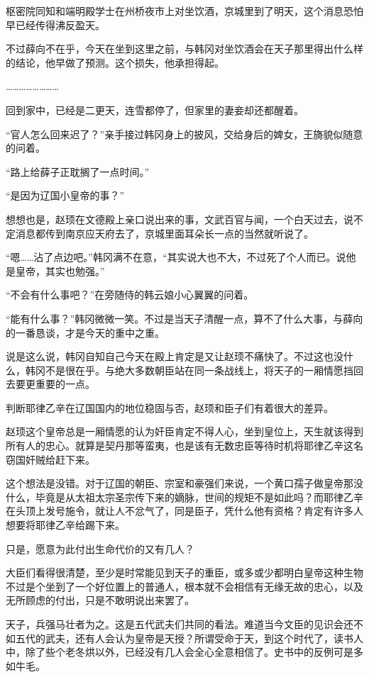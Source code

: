 枢密院同知和端明殿学士在州桥夜市上对坐饮酒，京城里到了明天，这个消息恐怕早已经传得沸反盈天。

不过薛向不在乎，今天在坐到这里之前，与韩冈对坐饮酒会在天子那里得出什么样的结论，他早做了预测。这个损失，他承担得起。

……………………

回到家中，已经是二更天，连雪都停了，但家里的妻妾却还都醒着。

“官人怎么回来迟了？”亲手接过韩冈身上的披风，交给身后的婢女，王旖貌似随意的问着。

“路上给薛子正耽搁了一点时间。”

“是因为辽国小皇帝的事？”

想想也是，赵顼在文德殿上亲口说出来的事，文武百官与闻，一个白天过去，说不定消息都传到南京应天府去了，京城里面耳朵长一点的当然就听说了。

“嗯……沾了点边吧。”韩冈满不在意，“其实说大也不大，不过死了个人而已。说他是皇帝，其实也勉强。”

“不会有什么事吧？”在旁随侍的韩云娘小心翼翼的问着。

“能有什么事？”韩冈微微一笑。不过是当天子清醒一点，算不了什么大事，与薛向的一番恳谈，才是今天的重中之重。

说是这么说，韩冈自知自己今天在殿上肯定是又让赵顼不痛快了。不过这也没什么，韩冈不是很在乎。与绝大多数朝臣站在同一条战线上，将天子的一厢情愿挡回去要更重要的一点。

判断耶律乙辛在辽国国内的地位稳固与否，赵顼和臣子们有着很大的差异。

赵顼这个皇帝总是一厢情愿的认为奸臣肯定不得人心，坐到皇位上，天生就该得到所有人的忠心。就算是契丹那等蛮夷，也是该有无数忠臣等待时机将耶律乙辛这名窃国奸贼给赶下来。

这个想法是没错。对于辽国的朝臣、宗室和豪强们来说，一个黄口孺子做皇帝那没什么，毕竟是从太祖太宗圣宗传下来的嫡脉，世间的规矩不是如此吗？而耶律乙辛在头顶上发号施令，就让人不忿气了，同是臣子，凭什么他有资格？肯定有许多人想要将耶律乙辛给踢下来。

只是，愿意为此付出生命代价的又有几人？

大臣们看得很清楚，至少是时常能见到天子的重臣，或多或少都明白皇帝这种生物不过是个坐到了一个好位置上的普通人，根本就不会相信有无缘无故的忠心，以及无所顾虑的付出，只是不敢明说出来罢了。

天子，兵强马壮者为之。这是五代武夫们共同的看法。难道当今文臣的见识会还不如五代的武夫，还有人会认为皇帝是天授？所谓受命于天，到这个时代了，读书人中，除了些个老冬烘以外，已经没有几人会全心全意相信了。史书中的反例可是多如牛毛。

